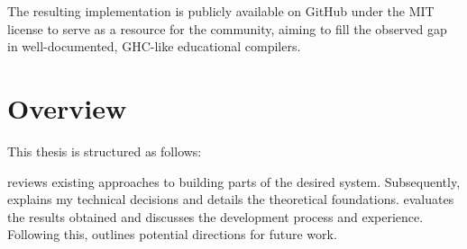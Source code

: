 The resulting implementation is publicly available on GitHub \cite{deemp-arbitrary-rank-tutorial} under the MIT license to serve as a resource for the community, aiming to fill the observed gap in well-documented, GHC-like educational compilers.

\section{Overview}

This thesis is structured as follows:

 reviews existing approaches to building parts of the desired system.
Subsequently,  explains my technical decisions and details the theoretical foundations.
 evaluates the results obtained and discusses the development process and experience.
Following this,  outlines potential directions for future work.
